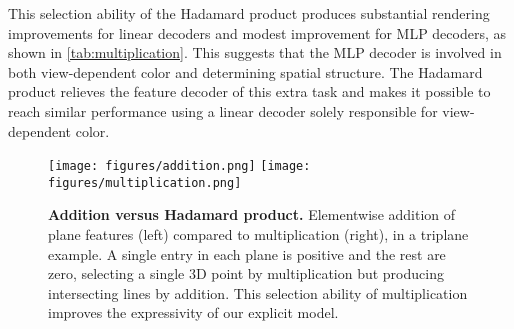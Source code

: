 \documentclass[10pt,twocolumn,letterpaper]{article}
\begin{document}
This selection ability of the Hadamard product produces substantial rendering improvements for linear decoders and modest improvement for MLP decoders, as shown in \cref{tab:multiplication}. This suggests that the MLP decoder is involved in both view-dependent color and determining spatial structure. The Hadamard product relieves the feature decoder of this extra task and makes it possible to reach similar performance using a linear decoder solely responsible for view-dependent color.



\begin{figure}[ht!]
\begin{minipage}[]{1\linewidth}
  \centering
  \texttt{[image: figures/addition.png]}
  \texttt{[image: figures/multiplication.png]}
\end{minipage}
\caption{\textbf{Addition versus Hadamard product.} Elementwise addition of plane features (left) compared to multiplication (right), in a triplane example. A single entry in each plane is positive and the rest are zero, selecting a single 3D point by multiplication but producing intersecting lines by addition. This selection ability of multiplication improves the expressivity of our explicit model.}
\label{fig:multiplication}
\end{figure}


\renewcommand{\tabcolsep}{6pt}
\begin{table}[ht]
  \centering
  \caption{\textbf{Ablation study over Hadamard product.} Multiplication of plane features yields a large improvement in PSNR  for our explicit model, whereas our hybrid model can use its MLP decoder to partially compensate for the less expressive addition of planes. This experiment uses the static \emph{Lego} scene \cite{nerf} with  scales: , , and , and  features per scale.}
  \label{tab:multiplication}
\end{table}
\end{document}
